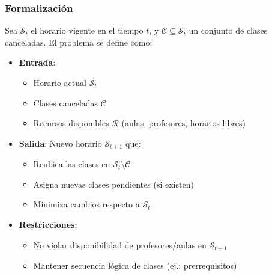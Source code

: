 \documentclass[12pt, a4paper]{article}
\begin{document}
\subsubsection*{Formalización}
Sea \( \mathcal{S}_t \) el horario vigente en el tiempo \( t \), y \( \mathcal{C} \subseteq \mathcal{S}_t \) un conjunto de clases canceladas. El problema se define como:
\begin{itemize}
    \item \textbf{Entrada}:
    \begin{itemize}
        \item Horario actual \( \mathcal{S}_t \)
        \item Clases canceladas \( \mathcal{C} \)
        \item Recursos disponibles \( \mathcal{R} \) (aulas, profesores, horarios libres)
    \end{itemize}
    
    \item \textbf{Salida}: Nuevo horario \( \mathcal{S}_{t+1} \) que:
    \begin{itemize}
        \item Reubica las clases en \( \mathcal{S}_t \setminus \mathcal{C} \)
        \item Asigna nuevas clases pendientes (si existen)
        \item Minimiza cambios respecto a \( \mathcal{S}_t \)
    \end{itemize}
    
    \item \textbf{Restricciones}:
    \begin{itemize}
        \item No violar disponibilidad de profesores/aulas en \( \mathcal{S}_{t+1} \)
        \item Mantener secuencia lógica de clases (ej.: prerrequisitos)
    \end{itemize}
\end{itemize}
\end{document}
